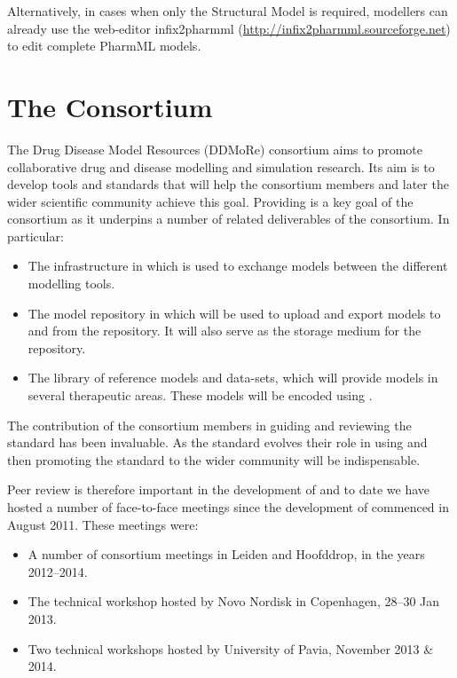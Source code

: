 Alternatively, in cases when only the Structural Model is required, modellers can 
already use the web-editor infix2pharmml (\url{http://infix2pharmml.sourceforge.net}) 
to edit complete PharmML models. 


\section{The \ddmore Consortium} 
\label{sec:ddmoreMeetings}


The Drug Disease Model Resources (DDMoRe) consortium aims to promote collaborative drug and disease
modelling and simulation research. Its aim is to develop tools and standards that will help the
consortium members and later the wider scientific community achieve this goal. Providing \pharmml
is a key goal of the consortium as it underpins a number of related deliverables of the consortium.
In particular:

\begin{itemize}
\item The \ddmore infrastructure in which \pharmml is used to exchange models between the different modelling tools.
\item The \ddmore model repository in which \pharmml will be used to upload and export models to and from the repository. It will also serve as the storage medium for the repository.
\item The \ddmore library of reference models and data-sets, which will provide models in several therapeutic areas. These models will be encoded using \pharmml.
\end{itemize}

The contribution of the \ddmore consortium members in guiding and reviewing the standard 
has been invaluable. As the standard evolves their role in using and then promoting the 
standard to the wider community will be indispensable.

Peer review is therefore important in the development of \pharmml and to date we have 
hosted a number of face-to-face meetings since the development of \pharmml 
commenced in August 2011. These meetings were:

\begin{itemize}
\item A number of \ddmore consortium meetings in Leiden and Hoofddrop, in the years 2012--2014.
\item The \ddmore technical workshop hosted by Novo Nordisk in Copenhagen, 28--30 Jan 2013.
\item Two \pml technical workshops hosted by University of Pavia, November 2013 \& 2014.
\end{itemize}

